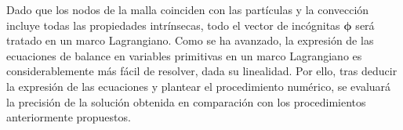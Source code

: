 Dado que los nodos de la malla coinciden con las partículas y la convección incluye todas las propiedades intrínsecas, todo el vector de incógnitas $\bm\phi$ será tratado en un marco Lagrangiano.
Como se ha avanzado, la expresión de las ecuaciones de balance en variables primitivas en un marco Lagrangiano es considerablemente más fácil de resolver, dada su linealidad. Por ello, tras deducir la expresión de las ecuaciones y plantear el procedimiento numérico, se evaluará la precisión de la solución obtenida en comparación con los procedimientos anteriormente propuestos.


